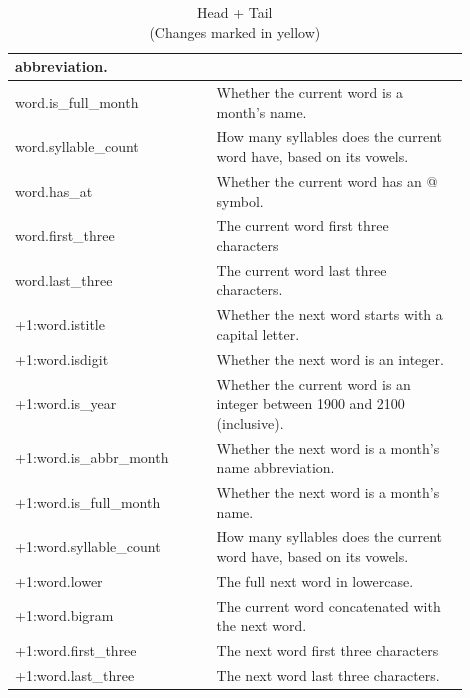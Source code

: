 \documentclass[a4paper, conference]{ieeeconf}
\begin{document}
\begin{table}[ht!]
\begin{tabular}{|p{0.4\linewidth}|p{0.5\linewidth}|}
      abbreviation. \\
      \hline
      \rowcolor{blue}
      word.is\_full\_month & Whether the current word is a month's name. \\
      \hline
      \rowcolor{blue}
      word.syllable\_count & How many syllables does the current word have,
      based on its vowels. \\
      \hline
      \rowcolor{blue}
      word.has\_at & Whether the current word has an @ symbol. \\
      \hline
      \rowcolor{pale_yellow}
      word.first\_three & The current word first three characters \\
      \hline
      \rowcolor{pale_yellow}
      word.last\_three & The current word last three characters. \\
      \hline
      \rowcolor{light_blue}
      +1:word.istitle & Whether the next word starts with a capital letter. \\
      \hline
      \rowcolor{light_blue}
      +1:word.isdigit & Whether the next word is an integer. \\
      \hline
      \rowcolor{light_blue}
      +1:word.is\_year & Whether the current word is an integer between 1900
      and 2100 (inclusive). \\
      \hline
      \rowcolor{light_blue}
      +1:word.is\_abbr\_month & Whether the next word is a month's name
      abbreviation. \\
      \hline
      \rowcolor{light_blue}
      +1:word.is\_full\_month & Whether the next word is a month's name. \\
      \hline
      \rowcolor{light_blue}
      +1:word.syllable\_count & How many syllables does the current word have,
      based on its vowels. \\
      \hline
      \rowcolor{light_blue}
      +1:word.lower & The full next word in lowercase. \\
      \hline
      \rowcolor{light_blue}
      +1:word.bigram & The current word concatenated with the next word. \\
      \hline
      \rowcolor{pale_yellow}
      +1:word.first\_three & The next word first three characters \\
      \hline
      \rowcolor{pale_yellow}
      +1:word.last\_three & The next word last three characters. \\
      \hline
    \end{tabular}
    \caption{Head + Tail \\ \textnormal{(Changes marked in yellow)}}
    \label{table:2}
  \end{table}
\end{document}
